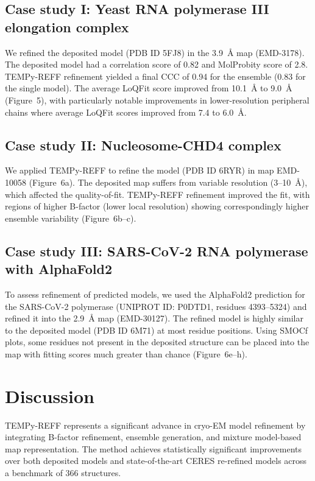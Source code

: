 \documentclass[11pt]{article}
\begin{document}
\subsection{Case study I: Yeast RNA polymerase III elongation complex}

We refined the deposited model (PDB ID 5FJ8) in the 3.9~\AA{} map (EMD-3178). The deposited model had a correlation score of 0.82 and MolProbity score of 2.8. TEMPy-REFF refinement yielded a final CCC of 0.94 for the ensemble (0.83 for the single model). The average LoQFit score improved from 10.1~\AA{} to 9.0~\AA{} (Figure~5), with particularly notable improvements in lower-resolution peripheral chains where average LoQFit scores improved from 7.4 to 6.0~\AA.

\subsection{Case study II: Nucleosome-CHD4 complex}

We applied TEMPy-REFF to refine the model (PDB ID 6RYR) in map EMD-10058 (Figure~6a). The deposited map suffers from variable resolution (3--10~\AA), which affected the quality-of-fit. TEMPy-REFF refinement improved the fit, with regions of higher B-factor (lower local resolution) showing correspondingly higher ensemble variability (Figure~6b--c).

\subsection{Case study III: SARS-CoV-2 RNA polymerase with AlphaFold2}

To assess refinement of predicted models, we used the AlphaFold2 \citep{jumper2021} prediction for the SARS-CoV-2 polymerase (UNIPROT ID: P0DTD1, residues 4393--5324) and refined it into the 2.9~\AA{} map (EMD-30127). The refined model is highly similar to the deposited model (PDB ID 6M71) at most residue positions. Using SMOCf plots, some residues not present in the deposited structure can be placed into the map with fitting scores much greater than chance (Figure~6e--h).

\section{Discussion}

TEMPy-REFF represents a significant advance in cryo-EM model refinement by integrating B-factor refinement, ensemble generation, and mixture model-based map representation. The method achieves statistically significant improvements over both deposited models and state-of-the-art CERES re-refined models across a benchmark of 366 structures.
\end{document}
